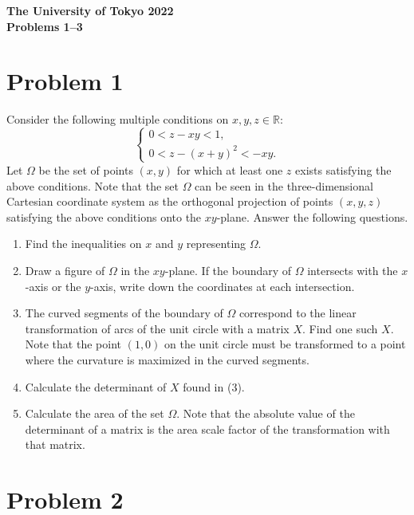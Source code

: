 \documentclass[10pt,a4paper]{article}
\begin{document}
\begin{center}
  {\Large \textbf{The University of Tokyo 2022}}\\[2mm]
  {\large \textbf{Problems 1--3}}
\end{center}

\section*{Problem 1}

Consider the following multiple conditions on $x,y,z\in\mathbb{R}$:
\[
  \begin{cases}
    0<z-xy<1,\\
    0<z-(x+y)^2<-xy.
  \end{cases}
\]
Let $\Omega$ be the set of points $(x,y)$ for which at least one $z$ exists satisfying the above conditions. Note that the set $\Omega$ can be seen in the three-dimensional Cartesian coordinate system as the orthogonal projection of points $(x,y,z)$ satisfying the above conditions onto the $xy$-plane. Answer the following questions.

\begin{enumerate}
  \item Find the inequalities on $x$ and $y$ representing $\Omega$.

  \item Draw a figure of $\Omega$ in the $xy$-plane. If the boundary of $\Omega$ intersects with the $x$-axis or the $y$-axis, write down the coordinates at each intersection.

  \item The curved segments of the boundary of $\Omega$ correspond to the linear transformation of arcs of the unit circle with a matrix $X$. Find one such $X$. Note that the point $(1,0)$ on the unit circle must be transformed to a point where the curvature is maximized in the curved segments.

  \item Calculate the determinant of $X$ found in (3).

  \item Calculate the area of the set $\Omega$. Note that the absolute value of the determinant of a matrix is the area scale factor of the transformation with that matrix.
\end{enumerate}

\section*{Problem 2}
\end{document}
